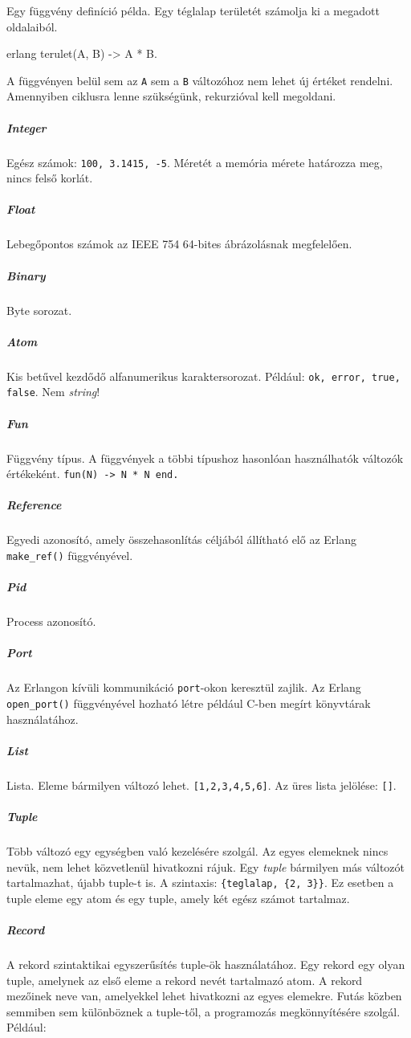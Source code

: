 \documentclass[12pt, a4paper, oneside]{book}
\begin{document}
Egy függvény definíció példa. Egy téglalap területét számolja ki a megadott
oldalaiból.

\begin{code}{erlang}{}
terulet(A, B) -> 
  A * B.
\end{code}

A függvényen belül sem az \texttt{A} sem a \texttt{B} változóhoz nem lehet új
értéket rendelni. Amennyiben ciklusra lenne szükségünk, rekurzióval
kell megoldani.

\subparagraph{Integer} Egész számok: \texttt{100, 3.1415, -5}. Méretét a
memória mérete határozza meg, nincs felső korlát.

\subparagraph{Float} Lebegőpontos számok az IEEE 754 64-bites ábrázolásnak
megfelelően.

\subparagraph{Binary} Byte sorozat.

\subparagraph{Atom} Kis betűvel kezdődő alfanumerikus karaktersorozat. Például:
\texttt{ok, error, true, false}. Nem \emph{string}!

\subparagraph{Fun} Függvény típus. A függvények a többi típushoz hasonlóan
használhatók változók értékeként. \texttt{fun(N) -> N * N  end.}

\subparagraph{Reference} Egyedi azonosító, amely összehasonlítás céljából
állítható elő az Erlang \texttt{make\_ref()} függvényével.

\subparagraph{Pid} Process azonosító.

\subparagraph{Port} Az Erlangon kívüli kommunikáció \texttt{port}-okon
keresztül zajlik. Az Erlang \texttt{open\_port()} függvényével hozható létre
például C-ben megírt könyvtárak használatához.

\subparagraph{List} Lista. Eleme bármilyen változó lehet.
\texttt{[1,2,3,4,5,6]}. Az üres lista jelölése: \texttt{[]}.

\subparagraph{Tuple} Több változó egy egységben való kezelésére szolgál. Az
egyes elemeknek nincs nevük, nem lehet közvetlenül hivatkozni rájuk. Egy
\emph{tuple} bármilyen más változót tartalmazhat, újabb tuple-t is. A
szintaxis: \texttt{\{teglalap, \{2, 3\}\}}. Ez esetben a tuple eleme egy atom
és egy tuple, amely két egész számot tartalmaz.

\subparagraph{Record} A rekord szintaktikai egyszerűsítés tuple-ök
használatához. Egy rekord egy olyan tuple, amelynek az első eleme a rekord
nevét tartalmazó atom. A rekord mezőinek neve van, amelyekkel lehet hivatkozni
az egyes elemekre. Futás közben semmiben sem különböznek a tuple-től, a
programozás megkönnyítésére szolgál. Például:
\end{document}
